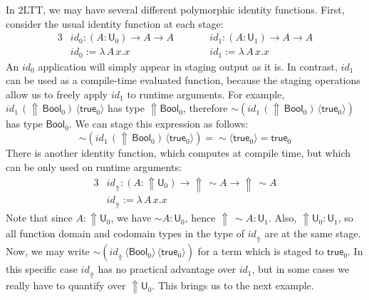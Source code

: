 \documentclass[acmsmall,review]{acmart}
\newcommand{\mit}[1]{\mathit{#1}}
\newcommand{\msf}[1]{\mathsf{#1}}
\newcommand{\Lift}{{\Uparrow}}
\newcommand{\spl}{{\sim}}
\newcommand{\qut}[1]{\langle #1\rangle}
\renewcommand{\U}{\msf{U}}
\newcommand{\Bool}{\msf{Bool}}
\newcommand{\true}{\msf{true}}
\theoremstyle{remark}
\begin{document}
In 2LTT, we may have several different polymorphic identity functions. First,
consider the usual identity function at each stage:
\begin{alignat*}{3}
  & \mit{id}_0 : (A : \U_0) \to A \to A\hspace{2em} && \mit{id}_1 : (A : \U_1) \to A \to A\\
  & \mit{id}_0 := \lambda\,A\,x.x       && \mit{id}_1 := \lambda\,A\,x.x
\end{alignat*}
An $\mit{id}_0$ application will simply appear in staging output as it is. In
contrast, $\mit{id}_1$ can be used as a compile-time evaluated function, because
the staging operations allow us to freely apply $\mit{id}_1$ to runtime
arguments. For example, $\mit{id}_1\,(\Lift\,\Bool_0)\,\qut{\true_0}$ has type
$\Lift \Bool_0$, therefore $\spl(\mit{id}_1\,(\Lift\,\Bool_0)\,\qut{\true_0})$
has type $\Bool_0$. We can stage this expression as follows:
\[
\spl(\mit{id}_1\,(\Lift\,\Bool_0)\,\qut{\true_0}) = \spl\qut{\true_0} = \true_0
\]
There is another identity function, which computes at compile time, but which
can be only used on runtime arguments:
\begin{alignat*}{3}
  & \mit{id_\Lift} : (A : \Lift\U_0) \to \Lift\,\spl A \to \Lift\,\spl A\\
  & \mit{id_\Lift} := \lambda\,A\,x.x
\end{alignat*}
Note that since $A : \Lift\U_0$, we have $\spl A : \U_0$, hence $\Lift\,\spl A
: \U_1$.  Also, $\Lift\U_0 : \U_1$, so all function domain and codomain types in
the type of $\mit{id_\Lift}$ are at the same stage. Now, we may write
$\spl(\mit{id_\Lift}\,\qut{\Bool_0}\,\qut{\true_0})$ for a term which is staged
to $\true_0$. In this specific case $\mit{id_\Lift}$ has no practical advantage
over $\mit{id}_1$, but in some cases we really have to quantify over
$\Lift\U_0$. This brings us to the next example.
\end{document}

